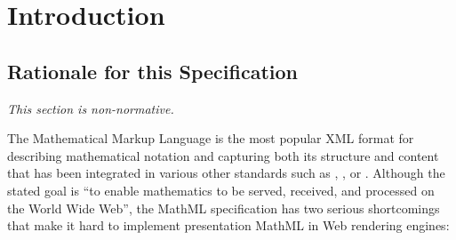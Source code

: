 \section{Introduction}

\subsection{Rationale for this Specification}

{\em This section is non-normative.}

The Mathematical Markup Language is the most popular XML format for describing
mathematical notation and capturing both its structure and content
\cite{MathML3} that has been integrated in various other standards such as
\cite{HTML5}, \cite{EPUB3}, \cite{ODF1} or \cite{Daisy3}. Although
the stated goal is ``to enable mathematics to be served, received, and
processed on the World Wide Web'', the MathML specification has
two serious shortcomings that make it hard to implement presentation MathML in
Web rendering engines:

